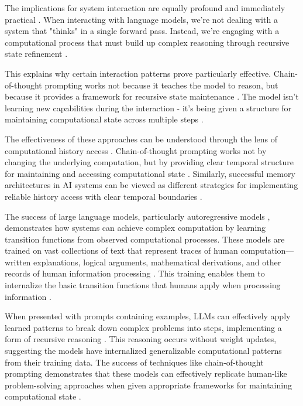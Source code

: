 \documentclass[12pt]{article}
\begin{document}
The implications for system interaction are equally profound and immediately practical \cite{wei2022chain}. When interacting with language models, we're not dealing with a system that "thinks" in a single forward pass. Instead, we're engaging with a computational process that must build up complex reasoning through recursive state refinement \cite{dickson2024trust}.

This explains why certain interaction patterns prove particularly effective. Chain-of-thought prompting works not because it teaches the model to reason, but because it provides a framework for recursive state maintenance \cite{wei2022chain}. The model isn't learning new capabilities during the interaction - it's being given a structure for maintaining computational state across multiple steps \cite{ahn2024recursive}.

The effectiveness of these approaches can be understood through the lens of computational history access \cite{fu2024memory}. Chain-of-thought prompting works not by changing the underlying computation, but by providing clear temporal structure for maintaining and accessing computational state \cite{wei2022chain}. Similarly, successful memory architectures in AI systems can be viewed as different strategies for implementing reliable history access with clear temporal boundaries \cite{yang2013survey}.

The success of large language models, particularly autoregressive models \cite{schuurmans2024autoregressive}, demonstrates how systems can achieve complex computation by learning transition functions from observed computational processes. These models are trained on vast collections of text that represent traces of human computation---written explanations, logical arguments, mathematical derivations, and other records of human information processing \cite{brown2020language}. This training enables them to internalize the basic transition functions that humans apply when processing information \cite{wei2022chain}.

When presented with prompts containing examples, LLMs can effectively apply learned patterns to break down complex problems into steps, implementing a form of recursive reasoning \cite{wei2022chain}. This reasoning occurs without weight updates, suggesting the models have internalized generalizable computational patterns from their training data. The success of techniques like chain-of-thought prompting demonstrates that these models can effectively replicate human-like problem-solving approaches when given appropriate frameworks for maintaining computational state \cite{wei2022emergent}.
\end{document}
